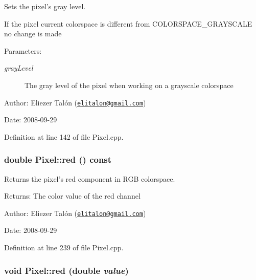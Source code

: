 Sets the pixel's gray level. 

If the pixel current colorspace is different from COLORSPACE\_\-GRAYSCALE no change is made

\begin{Desc}
\item[Parameters:]
\begin{description}
\item[{\em grayLevel}]The gray level of the pixel when working on a grayscale colorspace\end{description}
\end{Desc}
\begin{Desc}
\item[Author:]Eliezer Talón (\href{mailto:elitalon@gmail.com}{\tt elitalon@gmail.com}) \end{Desc}
\begin{Desc}
\item[Date:]2008-09-29 \end{Desc}


Definition at line 142 of file Pixel.cpp.\hypertarget{class_pixel_52542702e90cafc9c29713c23cd35e8f}{
\subsubsection[red]{\setlength{\rightskip}{0pt plus 5cm}double Pixel::red () const}}
\label{class_pixel_52542702e90cafc9c29713c23cd35e8f}


Returns the pixel's red component in RGB colorspace. 

\begin{Desc}
\item[Returns:]The color value of the red channel\end{Desc}
\begin{Desc}
\item[Author:]Eliezer Talón (\href{mailto:elitalon@gmail.com}{\tt elitalon@gmail.com}) \end{Desc}
\begin{Desc}
\item[Date:]2008-09-29 \end{Desc}


Definition at line 239 of file Pixel.cpp.\hypertarget{class_pixel_cc64470d744c5fc5b26cedb027366b5d}{
\subsubsection[red]{\setlength{\rightskip}{0pt plus 5cm}void Pixel::red (double {\em value})}}
\label{class_pixel_cc64470d744c5fc5b26cedb027366b5d}


